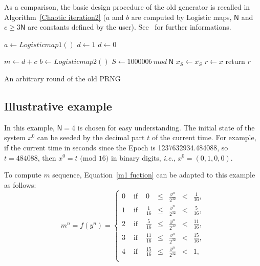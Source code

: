 \documentclass[10pt, a4paper, conference, compsocconf]{IEEEtran}
\begin{document}
As a comparison, the basic design procedure of the old generator is recalled in Algorithm~\ref{Chaotic iteration2} ($a$ and $b$ are computed by Logistic maps, $\mathsf{N}$ and $c\geqslant 3\mathsf{N}$ are constants defined by the user). See~\cite{wang2009} for further informations.

\begin{algorithm}
\SetAlgoLined
{}
$a\leftarrow{Logistic map1()}$\;
      {
      $d\leftarrow 1$
      }
    \Else
      {
      $d\leftarrow 0$
      }

$m\leftarrow{d+c}$\;
{
$b\leftarrow{Logistic map2()}$\;
$S\leftarrow{100000b~mod~\mathsf{N}}$\;
$x_S\leftarrow{ \overline{x_S}}$\;
}
$r\leftarrow{x}$\;
return $r$\;
\medskip
\caption{An arbitrary round of the old PRNG}
\label{Chaotic iteration2}
\end{algorithm}



\subsection{Illustrative example}
In this example, $\mathsf{N} = 4$ is chosen for easy understanding.
The initial state of the system $x^0$ can be seeded by the decimal part $t$ of the current time. 
For example, if the current time in seconds since the Epoch is 1237632934.484088, 
so $t = 484088$, then $x^0 = t \text{ (mod 16)}$ in binary digits, \emph{i.e.}, $x^0 = ( 0, 1, 0, 0)$. 

To compute $m$ sequence, Equation~\ref{m1 fuction} can be adapted to this example as follows:
\begin{equation}
\label{m1 fuction}
m^n=f(y^n)=
\left\{
\begin{array}{llccccc}
0 & \text{ if }&0				&\leqslant&\frac{y^n}{2^{32}}&<&\frac{1}{16},\\
1 & \text{ if }&\frac{1}{16}			&\leqslant&\frac{y^n}{2^{32}}&<&\frac{5}{16} ,\\
2 & \text{ if }&\frac{5}{16}			&\leqslant&\frac{y^n}{2^{32}}&<&\frac{11}{16},\\
3 & \text{ if }&\frac{11}{16}			&\leqslant&\frac{y^n}{2^{32}}&<&\frac{15}{16},\\
4 & \text{ if }&\frac{15}{16}			&\leqslant&\frac{y^n}{2^{32}}&<&1,\\
\end{array}
\right.
\end{equation}
\end{document}
